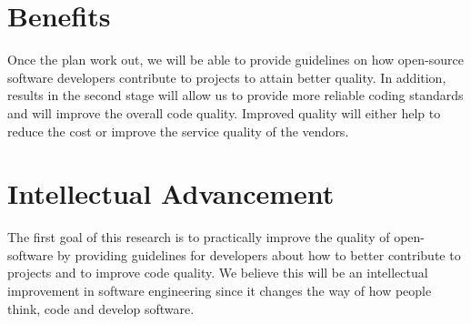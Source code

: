 \documentclass[10pt,conference]{IEEEtran}
\begin{document}
\section{Benefits}

Once the plan work out, we will be able to provide guidelines on how open-source software developers contribute to projects to attain better quality. 
In addition, results in the second stage will allow us to provide more reliable coding standards and will improve the overall code quality.
Improved quality will either help to reduce the cost or improve the service quality of the vendors.

\section{Intellectual Advancement}

The first goal of this research is to practically improve the quality of open-software by providing guidelines for developers about how to better contribute to projects and to improve code quality. 
We believe this will be an intellectual improvement in software engineering since it changes the way of how people think, code and develop software.

\medskip
%
%

\vspace{12pt}
\color{red}
\end{document}
